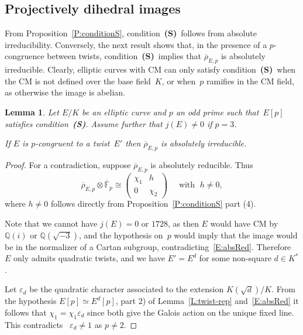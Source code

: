\documentclass[12pt, reqno]{amsart}
\newcommand{\F}{\mathbb{F}}
\newcommand{\Fbar}{{\overline{\F}}}
\newcommand{\Q}{\mathbb{Q}}
\newcommand{\rhobar}{{\overline{\rho}}}
\newcommand{\eps}{\varepsilon}
\numberwithin{equation}{section}
\newtheorem{lemma}[theorem]{Lemma}
\theoremstyle{definition}
\theoremstyle{remark}
\newcommand{\condS}{condition~{\bf (S)}}
\begin{document}
\subsection{Projectively dihedral images}
\label{SS:dihedral}
From Proposition~\ref{P:conditionS}, \condS\ follows from
absolute irreducibility.  Conversely, the next result shows that, in
the presence of a $p$-congruence between twists, \condS\
implies that $\rhobar_{E,p}$ is absolutely irreducible.  Clearly,
elliptic curves with CM can only satisfy \condS\ when the
CM is not defined over the base field~$K$, or when~$p$ ramifies in the
CM field, as otherwise the image is abelian.

\begin{lemma} \label{L:noCyclic}
Let $E/K$ be an elliptic curve and $p$ an odd prime such that~$E[p]$
satisfies \condS. Assume further that $j(E) \neq 0$ if $p=3$.  

If $E$ is $p$-congruent to a
twist~$E'$ then $\rhobar_{E,p}$ is absolutely irreducible.
\end{lemma}
\begin{proof}
For a contradiction, suppose $\rhobar_{E,p}$ is absolutely reducible. Thus
\begin{equation} \label{E:absRed}
  \rhobar_{E,p} \otimes \Fbar_p \cong 
 \begin{pmatrix}
 \chi_1 & h \\ 0 &\chi_2
 \end{pmatrix} \quad \text{ with } \; h \neq 0, 
\end{equation} 
where $h \neq 0$ follows directly from
Proposition~\ref{P:conditionS} part (4).


Note that we cannot have $j(E) =0$ or $1728$, as then
$E$ would have CM by~$\Q(i)$ or $\Q(\sqrt{-3})$, and the hypothesis
on~$p$ would imply that the image would be in the normalizer of a
Cartan subgroup, contradicting~\eqref{E:absRed}. Therefore $E$ only admits
quadratic twists, and we have $E' = E^d$ for some non-square $d \in
K^*$.

Let $\eps_d$ be the quadratic character associated to the extension
$K(\sqrt{d})/K$. From the hypothesis $E[p] \simeq E^d[p]$, part 2) of
Lemma~\ref{L:twist-rep} and~\eqref{E:absRed} it follows that $\chi_1
=\chi_1\eps_d$ since both give the Galois action on the unique fixed
line. This contradicts ~$\eps_d \neq 1$ as $p \neq 2$.
\end{proof}
\end{document}
